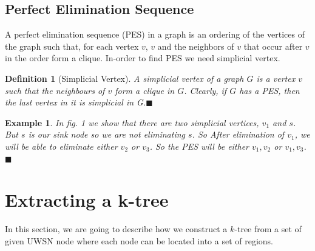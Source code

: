 \documentclass[12pt]{article}
\newtheorem{lemma}[theorem]{Lemma}
\newtheorem*{defi}{Definition}
\newtheorem{exmp}{Example}[section]
\begin{document}
\subsection{Perfect Elimination Sequence}
A perfect elimination sequence (PES) in a graph is an ordering of the vertices of the graph such that, for each vertex $v$, $v$ and the neighbors of $v$ that occur after $v$ in the order form a clique. In-order to find PES we need simplicial vertex.
\begin{defi}[Simplicial Vertex]
\normalfont
A simplicial vertex of a graph $G$ is a vertex $v$ such that the neighbours of $v$ form a clique in $G$. Clearly, if $G$ has a PES, then the last vertex in it is simplicial in G.$\blacksquare$
\end{defi}

\begin{exmp}
\normalfont
In fig. 1 we show that there are two simplicial vertices, $v_1$ and $s$. But $s$ is our sink node so we are not eliminating $s$. So After elimination of $v_1$, we will be able to eliminate either $v_2$ or $v_3$. So the PES will be either $v_1,v_2$ or $v_1,v_3$.$\blacksquare$
\end{exmp}
\section{Extracting a k-tree}
In this section, we are going to describe how we construct a $k$-tree from a set of given UWSN node where each node can be located into a set of regions.
\end{document}
